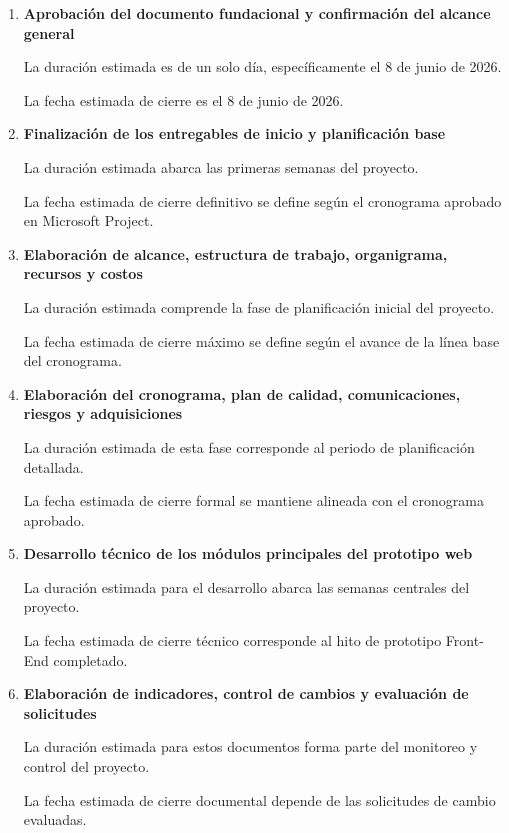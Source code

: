\documentclass[11pt,spanish]{article}
\begin{document}
\begin{enumerate}
    \item \textbf{Aprobación del documento fundacional y confirmación del alcance general}

    La duración estimada es de un solo día, específicamente el 8 de junio de 2026.

    La fecha estimada de cierre es el 8 de junio de 2026.

    \item \textbf{Finalización de los entregables de inicio y planificación base}

    La duración estimada abarca las primeras semanas del proyecto.

    La fecha estimada de cierre definitivo se define según el cronograma aprobado en Microsoft Project.

    \item \textbf{Elaboración de alcance, estructura de trabajo, organigrama, recursos y costos}

    La duración estimada comprende la fase de planificación inicial del proyecto.

    La fecha estimada de cierre máximo se define según el avance de la línea base del cronograma.

    \item \textbf{Elaboración del cronograma, plan de calidad, comunicaciones, riesgos y adquisiciones}

    La duración estimada de esta fase corresponde al periodo de planificación detallada.

    La fecha estimada de cierre formal se mantiene alineada con el cronograma aprobado.

    \item \textbf{Desarrollo técnico de los módulos principales del prototipo web}

    La duración estimada para el desarrollo abarca las semanas centrales del proyecto.

    La fecha estimada de cierre técnico corresponde al hito de prototipo Front-End completado.

    \item \textbf{Elaboración de indicadores, control de cambios y evaluación de solicitudes}

    La duración estimada para estos documentos forma parte del monitoreo y control del proyecto.

    La fecha estimada de cierre documental depende de las solicitudes de cambio evaluadas.


\end{enumerate}
\end{document}
